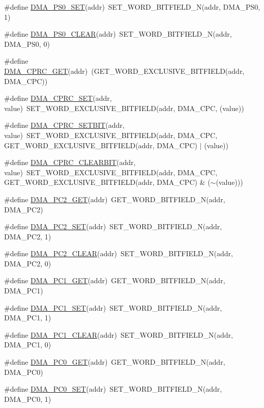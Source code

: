 \begin{DoxyCompactItemize}
\#define \hyperlink{a00548_a76dae545125f04dce616b888baf3c619}{DMA\_\-PS0\_\-SET}(addr)~SET\_\-WORD\_\-BITFIELD\_\-N(addr, DMA\_\-PS0, 1)
\item 
\#define \hyperlink{a00548_adb3e73956a89bb0ac70a73ba632d2611}{DMA\_\-PS0\_\-CLEAR}(addr)~SET\_\-WORD\_\-BITFIELD\_\-N(addr, DMA\_\-PS0, 0)
\item 
\#define \hyperlink{a00548_a020fea1a6e5f0f82eec4362afec320f3}{DMA\_\-CPRC\_\-GET}(addr)~(GET\_\-WORD\_\-EXCLUSIVE\_\-BITFIELD(addr, DMA\_\-CPC))
\item 
\#define \hyperlink{a00548_ab43e122bc16208d364b5d5058f5b13a4}{DMA\_\-CPRC\_\-SET}(addr, value)~SET\_\-WORD\_\-EXCLUSIVE\_\-BITFIELD(addr, DMA\_\-CPC, (value))
\item 
\#define \hyperlink{a00548_ae06c6a8958375162211bd2b815903500}{DMA\_\-CPRC\_\-SETBIT}(addr, value)~SET\_\-WORD\_\-EXCLUSIVE\_\-BITFIELD(addr, DMA\_\-CPC, GET\_\-WORD\_\-EXCLUSIVE\_\-BITFIELD(addr, DMA\_\-CPC) $|$ (value))
\item 
\#define \hyperlink{a00548_a009d80fc7e4b926fa86f2795184f4313}{DMA\_\-CPRC\_\-CLEARBIT}(addr, value)~SET\_\-WORD\_\-EXCLUSIVE\_\-BITFIELD(addr, DMA\_\-CPC, GET\_\-WORD\_\-EXCLUSIVE\_\-BITFIELD(addr, DMA\_\-CPC) \& ($\sim$(value)))
\item 
\#define \hyperlink{a00548_a5f10a162baaa08223ec6e2b92d716b8d}{DMA\_\-PC2\_\-GET}(addr)~GET\_\-WORD\_\-BITFIELD\_\-N(addr, DMA\_\-PC2)
\item 
\#define \hyperlink{a00548_ac7deac44e697ec30a701b55a793a0e21}{DMA\_\-PC2\_\-SET}(addr)~SET\_\-WORD\_\-BITFIELD\_\-N(addr, DMA\_\-PC2, 1)
\item 
\#define \hyperlink{a00548_ac6a7bf06471e64496a88456f842e5145}{DMA\_\-PC2\_\-CLEAR}(addr)~SET\_\-WORD\_\-BITFIELD\_\-N(addr, DMA\_\-PC2, 0)
\item 
\#define \hyperlink{a00548_aa03053ca00d868bf0d653b39c0a3a3c9}{DMA\_\-PC1\_\-GET}(addr)~GET\_\-WORD\_\-BITFIELD\_\-N(addr, DMA\_\-PC1)
\item 
\#define \hyperlink{a00548_a0fb27f20646291025550ca311d8e2bb9}{DMA\_\-PC1\_\-SET}(addr)~SET\_\-WORD\_\-BITFIELD\_\-N(addr, DMA\_\-PC1, 1)
\item 
\#define \hyperlink{a00548_a700fe1ec8617eaed6c5560ed6294ffcd}{DMA\_\-PC1\_\-CLEAR}(addr)~SET\_\-WORD\_\-BITFIELD\_\-N(addr, DMA\_\-PC1, 0)
\item 
\#define \hyperlink{a00548_a0502743d830bbd67012ae305271e7433}{DMA\_\-PC0\_\-GET}(addr)~GET\_\-WORD\_\-BITFIELD\_\-N(addr, DMA\_\-PC0)
\item 
\#define \hyperlink{a00548_aed6320f09ab94693c563d3e717e67696}{DMA\_\-PC0\_\-SET}(addr)~SET\_\-WORD\_\-BITFIELD\_\-N(addr, DMA\_\-PC0, 1)

\end{DoxyCompactItemize}
